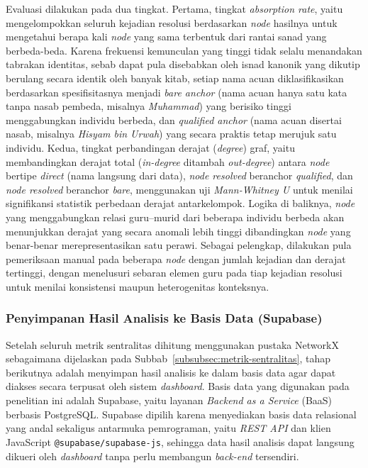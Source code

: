 Evaluasi dilakukan pada dua tingkat. Pertama, tingkat \textit{absorption rate}, yaitu mengelompokkan seluruh kejadian resolusi berdasarkan \textit{node} hasilnya untuk mengetahui berapa kali \textit{node} yang sama terbentuk dari rantai sanad yang berbeda-beda. Karena frekuensi kemunculan yang tinggi tidak selalu menandakan tabrakan identitas, sebab dapat pula disebabkan oleh isnad kanonik yang dikutip berulang secara identik oleh banyak kitab, setiap nama acuan diklasifikasikan berdasarkan spesifisitasnya menjadi \textit{bare anchor} (nama acuan hanya satu kata tanpa nasab pembeda, misalnya \textit{Muhammad}) yang berisiko tinggi menggabungkan individu berbeda, dan \textit{qualified anchor} (nama acuan disertai nasab, misalnya \textit{Hisyam bin Urwah}) yang secara praktis tetap merujuk satu individu. Kedua, tingkat perbandingan derajat (\textit{degree}) graf, yaitu membandingkan derajat total (\textit{in-degree} ditambah \textit{out-degree}) antara \textit{node} bertipe \textit{direct} (nama langsung dari data), \textit{node resolved} beranchor \textit{qualified}, dan \textit{node resolved} beranchor \textit{bare}, menggunakan uji \textit{Mann-Whitney U} untuk menilai signifikansi statistik perbedaan derajat antarkelompok. Logika di baliknya, \textit{node} yang menggabungkan relasi guru--murid dari beberapa individu berbeda akan menunjukkan derajat yang secara anomali lebih tinggi dibandingkan \textit{node} yang benar-benar merepresentasikan satu perawi. Sebagai pelengkap, dilakukan pula pemeriksaan manual pada beberapa \textit{node} dengan jumlah kejadian dan derajat tertinggi, dengan menelusuri sebaran elemen guru pada tiap kejadian resolusi untuk menilai konsistensi maupun heterogenitas konteksnya.

\subsubsection{Penyimpanan Hasil Analisis ke Basis Data (Supabase)}
\label{subsubsec:penyimpanan-basis-data}
\begin{sloppypar}
Setelah seluruh metrik sentralitas dihitung menggunakan pustaka NetworkX sebagaimana dijelaskan pada Subbab~\ref{subsubsec:metrik-sentralitas}, tahap berikutnya adalah menyimpan hasil analisis ke dalam basis data agar dapat diakses secara terpusat oleh sistem \textit{dashboard}. Basis data yang digunakan pada penelitian ini adalah Supabase, yaitu layanan \textit{Backend as a Service} (BaaS) berbasis PostgreSQL. Supabase dipilih karena menyediakan basis data relasional yang andal sekaligus antarmuka pemrograman, yaitu \textit{REST API} dan klien JavaScript \texttt{@supabase/supabase-js}, sehingga data hasil analisis dapat langsung dikueri oleh \textit{dashboard} tanpa perlu membangun \textit{back-end} tersendiri.
\end{sloppypar}

